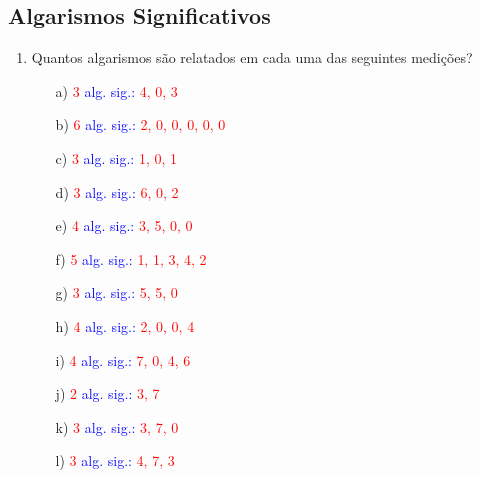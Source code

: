 \documentclass[a4paper, 12pt]{article}
\begin{document}
\subsection*{Algarismos Significativos}

\begin{enumerate}
    \item Quantos algarismos são relatados em cada uma das seguintes medições?
          \begin{multicols}{2}
              \begin{itemize}
                  \item[a)]  \textcolor{red}{3} \textcolor{blue}{alg. sig.:} \textcolor{red}{4, 0, 3}
                  \item[b)]  \textcolor{red}{6} \textcolor{blue}{alg. sig.:} \textcolor{red}{2, 0, 0, 0, 0, 0}
                  \item[c)]  \textcolor{red}{3} \textcolor{blue}{alg. sig.:} \textcolor{red}{1, 0, 1}
                  \item[d)]  \textcolor{red}{3} \textcolor{blue}{alg. sig.:} \textcolor{red}{6, 0, 2}
                  \item[e)] \text{3500cm} \textcolor{red}{4} \textcolor{blue}{alg. sig.:} \textcolor{red}{3, 5, 0, 0}
                  \item[f)]  \textcolor{red}{5} \textcolor{blue}{alg. sig.:} \textcolor{red}{1, 1, 3, 4, 2}
                  \item[g)]  \textcolor{red}{3} \textcolor{blue}{alg. sig.:} \textcolor{red}{5, 5, 0}
                  \item[h)]  \textcolor{red}{4} \textcolor{blue}{alg. sig.:} \textcolor{red}{2, 0, 0, 4}
                  \item[i)]  \textcolor{red}{4} \textcolor{blue}{alg. sig.:} \textcolor{red}{7, 0, 4, 6}
                  \item[j)] \text{37mm} \textcolor{red}{2} \textcolor{blue}{alg. sig.:} \textcolor{red}{3, 7}
                  \item[k)]  \textcolor{red}{3} \textcolor{blue}{alg. sig.:} \textcolor{red}{3, 7, 0}
                  \item[l)]  \textcolor{red}{3} \textcolor{blue}{alg. sig.:} \textcolor{red}{4, 7, 3}
              \end{itemize}
          \end{multicols}


\end{enumerate}
\end{document}
